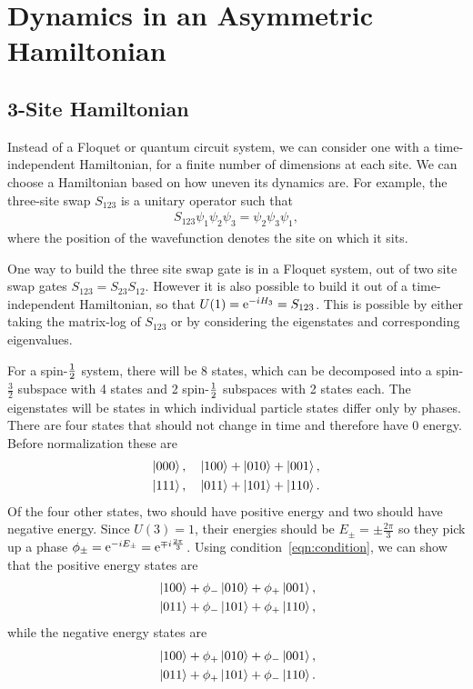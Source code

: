 \section{Dynamics in an Asymmetric Hamiltonian} \label{sec:asymham}

\subsection{3-Site Hamiltonian}  \label{sub:hamiltonian}

Instead of a Floquet or quantum circuit system, we can consider one with a time-independent Hamiltonian, for a finite number of dimensions at each site. We can choose a Hamiltonian based on how uneven its dynamics are. For example, the three-site swap $S_{123}$ is a unitary operator such that 
\begin{align}
S_{123}\psi_1\psi_2\psi_3 =\psi_2\psi_3\psi_1, \label{eqn:condition}
\end{align}
where the position of the wavefunction denotes the site on which it sits. 

One way to build the three site swap gate is in a Floquet system, out of two site swap gates $S_{123} = S_{23}S_{12}$. However it is also possible to build it out of a time-independent Hamiltonian, so that $U(1) = \text{e}^{-iH_3} = S_{123}$. This is possible by either taking the matrix-log of $S_{123}$ or by considering the eigenstates and corresponding eigenvalues. 

For a spin-$\frac{1}{2}$ system, there will be 8 states, which can be decomposed into a spin-$\frac{3}{2}$ subspace with 4 states and 2 spin-$\frac{1}{2}$ subspaces with 2 states each. The eigenstates will be states in which individual particle states differ only by phases. There are four states that should not change in time and therefore have 0 energy. Before normalization these are
\begin{align}
\left|000\right\rangle,\quad \left|100\right\rangle+\left|010\right\rangle+\left|001\right\rangle,\nonumber\\
\left|111\right\rangle,\quad \left|011\right\rangle+\left|101\right\rangle+\left|110\right\rangle.\label{eqn:zero}
\end{align}
Of the four other states, two should have positive energy and two should have negative energy. Since $U(3)=1$, their energies should be $E_\pm = \pm\frac{2\pi}{3}$ so they pick up a phase $\phi_\pm =\text{e}^{-iE_\pm} = \text{e}^{\mp i\frac{2\pi}{3}}$. Using condition~\ref{eqn:condition}, we can show that the positive energy states are
\begin{align}
&\left|100\right\rangle + \phi_-\left|010\right\rangle + \phi_+\left|001\right\rangle,\nonumber\\
&\left|011\right\rangle + \phi_-\left|101\right\rangle + \phi_+\left|110\right\rangle,\label{eqn:plus}
\end{align}
while the negative energy states are 
\begin{align}
&\left|100\right\rangle + \phi_+\left|010\right\rangle + \phi_-\left|001\right\rangle,\nonumber\\
&\left|011\right\rangle + \phi_+\left|101\right\rangle + \phi_-\left|110\right\rangle.\label{eqn:minus}
\end{align}

